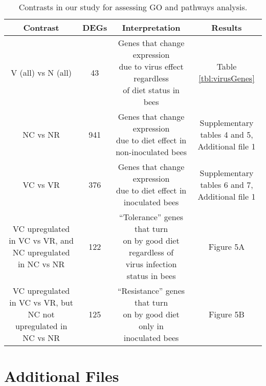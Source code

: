 \documentclass{bmcart}
\begin{document}
\begin{linenumbers}
\begin{backmatter}
\begin{table}[h!]
\begin{tabular}{cccc}
\hline
Contrast & DEGs & Interpretation & Results \\ 
\hline
V (all) vs N (all) & 43 & \makecell{Genes that change expression \\ due to virus effect regardless \\ of diet status in bees} & Table \ref{tbl:virusGenes} \\
\hline
NC vs NR & 941 & \makecell{Genes that change expression \\ due to diet effect in \\ non-inoculated bees} & \makecell{Supplementary \\ tables 4 and 5, \\ Additional file 1} \\
\hline
VC vs VR & 376 & \makecell{Genes that change expression \\ due to diet effect in \\ inoculated bees} & \makecell{Supplementary \\ tables 6 and 7, \\ Additional file 1} \\
\hline
\makecell{VC upregulated in VC vs VR, and \\ NC upregulated in NC vs NR} & 122 & \makecell{``Tolerance'' genes that turn \\ on by good diet regardless of \\ virus infection status in bees} & Figure 5A \\
\hline
\makecell{VC upregulated in VC vs VR, but \\ NC not upregulated in NC vs NR} & 125 & \makecell{``Resistance'' genes that turn \\ on by good diet only in \\ inoculated bees} & Figure 5B \\
\hline
\end{tabular}
\caption{Contrasts in our study for assessing GO and pathways analysis.}
  \label{tbl:contrasts}
\end{table}

\newpage
\section*{Additional Files}


\end{backmatter}
\end{linenumbers}
\end{document}
